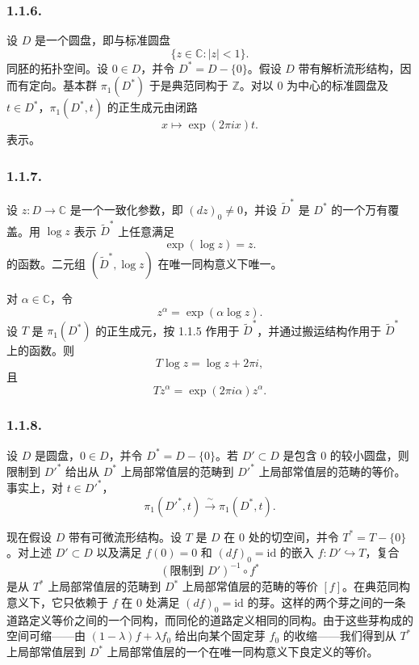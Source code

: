 \subsubsection*{1.1.6.}
设 $D$ 是一个圆盘，即与标准圆盘
\[
\{z\in\mathbb C:|z|<1\}.
\]
同胚的拓扑空间。设 $0\in D$，并令 $D^*=D-\{0\}$。假设 $D$ 带有解析流形结构，因而有定向。基本群 $\pi_1(D^*)$ 于是典范同构于 $\mathbb Z$。对以 $0$ 为中心的标准圆盘及 $t\in D^*$，$\pi_1(D^*,t)$ 的正生成元由闭路
\[
x\longmapsto \exp(2\pi i x)t.
\]
表示。

\subsubsection*{1.1.7.}
设 $z:D\longrightarrow\mathbb C$ 是一个一致化参数，即 $(dz)_0\ne0$，并设 $\widetilde D^*$ 是 $D^*$ 的一个万有覆盖。用 $\log z$ 表示 $\widetilde D^*$ 上任意满足
\[
\exp(\log z)=z.
\]
的函数。二元组 $(\widetilde D^*,\log z)$ 在唯一同构意义下唯一。

对 $\alpha\in\mathbb C$，令
\[
z^\alpha=\exp(\alpha\log z).
\]
设 $T$ 是 $\pi_1(D^*)$ 的正生成元，按 1.1.5 作用于 $\widetilde D^*$，并通过搬运结构作用于 $\widetilde D^*$ 上的函数。则
\begin{equation}\tag{1.1.7.1}
T\log z=\log z+2\pi i,
\end{equation}
且
\begin{equation}\tag{1.1.7.2}
Tz^\alpha=\exp(2\pi i\alpha)z^\alpha.
\end{equation}

\subsubsection*{1.1.8.}
设 $D$ 是圆盘，$0\in D$，并令 $D^*=D-\{0\}$。若 $D'\subset D$ 是包含 $0$ 的较小圆盘，则限制到 $D'^{*}$ 给出从 $D^*$ 上局部常值层的范畴到 $D'^{*}$ 上局部常值层的范畴的等价。事实上，对 $t\in D'^{*}$，
\[
\pi_1(D'^{*},t)\xrightarrow{\ \sim\ }\pi_1(D^*,t).
\]

现在假设 $D$ 带有可微流形结构。设 $T$ 是 $D$ 在 $0$ 处的切空间，并令 $T^*=T-\{0\}$。对上述 $D'\subset D$ 以及满足 $f(0)=0$ 和 $(df)_0=\mathrm{id}$ 的嵌入 $f:D'\hookrightarrow T$，复合
\[
(\text{限制到 }D')^{-1}\circ f^*
\]
是从 $T^*$ 上局部常值层的范畴到 $D^*$ 上局部常值层的范畴的等价 $[f]$。在典范同构意义下，它只依赖于 $f$ 在 $0$ 处满足 $(df)_0=\mathrm{id}$ 的芽。这样的两个芽之间的一条道路定义等价之间的一个同构，而同伦的道路定义相同的同构。由于这些芽构成的空间可缩——由 $(1-\lambda)f+\lambda f_0$ 给出向某个固定芽 $f_0$ 的收缩——我们得到从 $T^*$ 上局部常值层到 $D^*$ 上局部常值层的一个在唯一同构意义下良定义的等价。

